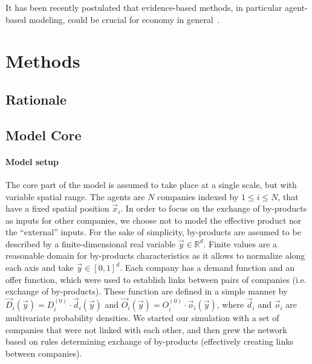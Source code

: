 \documentclass[fleqn,10pt]{wlscirep}
\begin{document}
It has been recently postulated that evidence-based methods, in particular agent-based modeling, could be crucial for economy in general~\cite{farmer2009economy}.





\section*{Methods} \label{sec:methods} %


\subsection*{Rationale}




\subsection*{Model Core}


\paragraph*{Model setup}

The core part of the model is assumed to take place at a single scale, but with variable spatial range. The agents are $N$ companies indexed by $1\leq i\leq N$, that have a fixed spatial position $\vec{x}_i$. In order to focus on the exchange of by-products as inputs for other companies, we choose not to model the effective product nor the ``external'' inputs. For the sake of simplicity, by-products are assumed to be described by a finite-dimensional real variable $\vec{y}\in \mathbb{R}^d$. Finite values are a reasonable domain for by-products characteristics as it allows to normalize along each axis and take $\vec{y} \in \left[0,1\right]^d$. Each company has a demand function and an offer function, which were used to establish links between pairs of companies (i.e. exchange of by-products). These function are defined in a simple manner by $\vec{D}_i (\vec{y})= D_i^{(0)}\cdot \vec{d}_i (\vec{y})$ and $\vec{O}_i (\vec{y})= O_i^{(0)}\cdot \vec{o}_i (\vec{y})$, where $\vec{d}_i$ and $\vec{o}_i$ are multivariate probability densities. We started our simulation with a set of companies that were not linked with each other, and then grew the network based on rules determining exchange of by-products (effectively creating links between companies).
\end{document}
